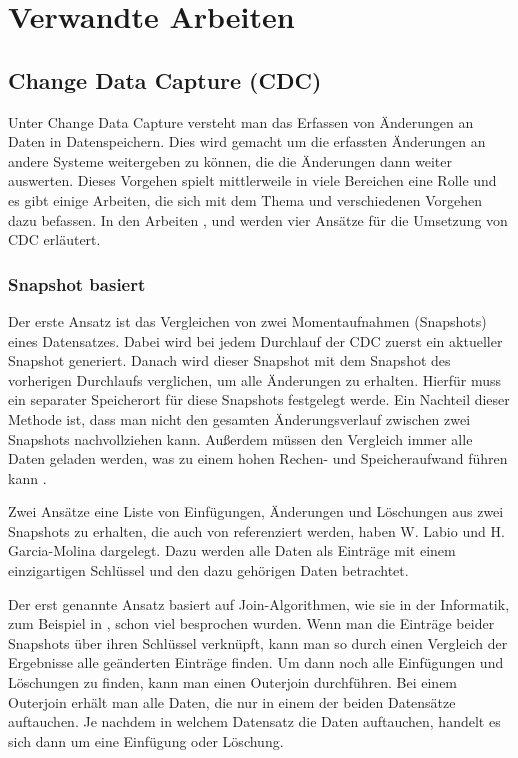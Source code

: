 \section{Verwandte Arbeiten}

\subsection{Change Data Capture (CDC)}

Unter Change Data Capture versteht man das Erfassen von Änderungen an Daten in Datenspeichern.
Dies wird gemacht um die erfassten Änderungen an andere Systeme weitergeben zu können, die die Änderungen dann weiter auswerten.
Dieses Vorgehen spielt mittlerweile in viele Bereichen eine Rolle und es gibt einige Arbeiten, die sich mit dem Thema und verschiedenen Vorgehen dazu befassen.
In den Arbeiten \parencite{delta-view_gen}, \parencite{cdc_in_nosql} und \parencite{boeing} werden vier Ansätze für die Umsetzung von CDC erläutert.

\subsubsection{Snapshot basiert}
Der erste Ansatz ist das Vergleichen von zwei Momentaufnahmen (Snapshots) eines Datensatzes.
Dabei wird bei jedem Durchlauf der CDC zuerst ein aktueller Snapshot generiert.
Danach wird dieser Snapshot mit dem Snapshot des vorherigen Durchlaufs verglichen, um alle Änderungen zu erhalten.
Hierfür muss ein separater Speicherort für diese Snapshots festgelegt werde.
Ein Nachteil dieser Methode ist, dass man nicht den gesamten Änderungsverlauf zwischen zwei Snapshots nachvollziehen kann.
Außerdem müssen den Vergleich immer alle Daten geladen werden, was zu einem hohen Rechen- und Speicheraufwand führen kann \cite{cdc_in_nosql}.

Zwei Ansätze eine Liste von Einfügungen, Änderungen und Löschungen aus zwei Snapshots zu erhalten, die auch von \citeauthor{cdc_in_nosql} \cite{cdc_in_nosql} referenziert werden, haben W. Labio und H. Garcia-Molina \cite{snapshot_algos} dargelegt.
Dazu werden alle Daten als Einträge mit einem einzigartigen Schlüssel und den dazu gehörigen Daten betrachtet.

Der erst genannte Ansatz basiert auf Join-Algorithmen, wie sie in der Informatik, zum Beispiel in \cite{joins}, schon viel besprochen wurden.
Wenn man die Einträge beider Snapshots über ihren Schlüssel verknüpft, kann man so durch einen Vergleich der Ergebnisse alle geänderten Einträge finden.
Um dann noch alle Einfügungen und Löschungen zu finden, kann man einen Outerjoin durchführen.
Bei einem Outerjoin erhält man alle Daten, die nur in einem der beiden Datensätze auftauchen.
Je nachdem in welchem Datensatz die Daten auftauchen, handelt es sich dann um eine Einfügung oder Löschung.

